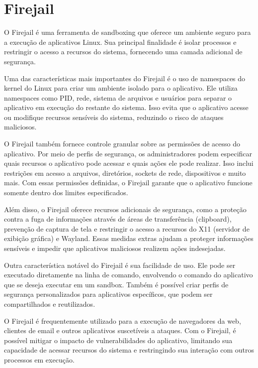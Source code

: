 \section{Firejail}

O Firejail é uma ferramenta de sandboxing que oferece um ambiente seguro para a execução de aplicativos Linux. Sua principal finalidade é isolar processos e restringir o acesso a recursos do sistema, fornecendo uma camada adicional de segurança.

Uma das características mais importantes do Firejail é o uso de namespaces do kernel do Linux para criar um ambiente isolado para o aplicativo. Ele utiliza namespaces como PID, rede, sistema de arquivos e usuários para separar o aplicativo em execução do restante do sistema. Isso evita que o aplicativo acesse ou modifique recursos sensíveis do sistema, reduzindo o risco de ataques maliciosos.

O Firejail também fornece controle granular sobre as permissões de acesso do aplicativo. Por meio de perfis de segurança, os administradores podem especificar quais recursos o aplicativo pode acessar e quais ações ele pode realizar. Isso inclui restrições em acesso a arquivos, diretórios, sockets de rede, dispositivos e muito mais. Com essas permissões definidas, o Firejail garante que o aplicativo funcione somente dentro dos limites especificados.

Além disso, o Firejail oferece recursos adicionais de segurança, como a proteção contra a fuga de informações através de áreas de transferência (clipboard), prevenção de captura de tela e restringir o acesso a recursos do X11 (servidor de exibição gráfica) e Wayland. Essas medidas extras ajudam a proteger informações sensíveis e impedir que aplicativos maliciosos realizem ações indesejadas.

Outra característica notável do Firejail é sua facilidade de uso. Ele pode ser executado diretamente na linha de comando, envolvendo o comando do aplicativo que se deseja executar em um sandbox. Também é possível criar perfis de segurança personalizados para aplicativos específicos, que podem ser compartilhados e reutilizados.

O Firejail é frequentemente utilizado para a execução de navegadores da web, clientes de email e outros aplicativos suscetíveis a ataques. Com o Firejail, é possível mitigar o impacto de vulnerabilidades do aplicativo, limitando sua capacidade de acessar recursos do sistema e restringindo sua interação com outros processos em execução.